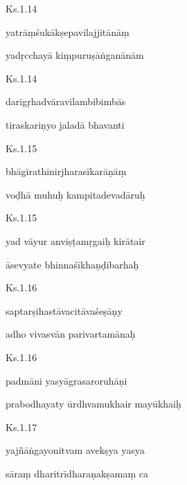 \documentclass{tufte-handout}
\newenvironment{sanskrit}%
{\begin{otherlanguage}{sanskrit-devanagari}}%
{\end{otherlanguage}}
\begin{document}
    
	\begin{sanskrit}
	
	    
		Ks.1.14 
    
	    
		yatrāṃśukākṣepavilajjitānāṃ 
    
	    
		yadṛcchayā kiṃpuruṣāṅganānām 
    
	\end{sanskrit}

    
	\begin{sanskrit}
	
	    
		Ks.1.14 
    
	    
		darīgṛhadvāravilambibimbās 
    
	    
		tiraskariṇyo jaladā bhavanti 
    
	\end{sanskrit}

    
	\begin{sanskrit}
	
	    
		Ks.1.15 
    
	    
		bhāgīrathīnirjharasīkarāṇāṃ 
    
	    
		voḍhā muhuḥ kampitadevadāruḥ 
    
	\end{sanskrit}

    
	\begin{sanskrit}
	
	    
		Ks.1.15 
    
	    
		yad vāyur anviṣṭamṛgaiḥ kirātair 
    
	    
		āsevyate bhinnaśikhaṇḍibarhaḥ 
    
	\end{sanskrit}

    
	\begin{sanskrit}
	
	    
		Ks.1.16 
    
	    
		saptarṣihastāvacitāvaśeṣāṇy 
    
	    
		adho vivasvān parivartamānaḥ 
    
	\end{sanskrit}

    
	\begin{sanskrit}
	
	    
		Ks.1.16 
    
	    
		padmāni yasyāgrasaroruhāṇi 
    
	    
		prabodhayaty ūrdhvamukhair mayūkhaiḥ 
    
	\end{sanskrit}

    
	\begin{sanskrit}
	
	    
		Ks.1.17 
    
	    
		yajñāṅgayonitvam avekṣya yasya 
    
	    
		sāraṃ dharitrīdharaṇakṣamaṃ ca 
    
	\end{sanskrit}
\end{document}
